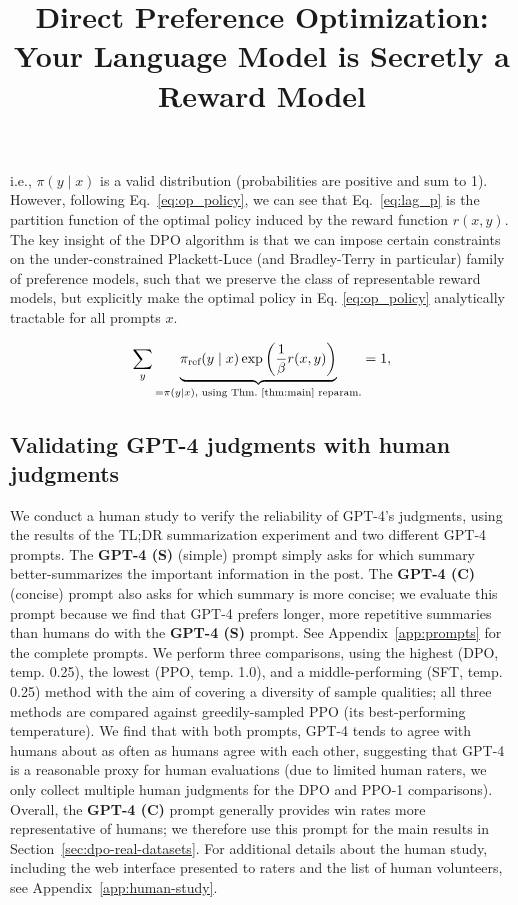 \title{Direct Preference Optimization: Your Language Model is Secretly a Reward Model}
i.e., $\pi(y\mid x)$ is a valid distribution (probabilities are positive and sum to 1). However, following Eq.~\ref{eq:op_policy}, we can see that Eq.~\ref{eq:lag_p} is the partition function of the optimal policy induced by the reward function $r(x, y)$. The key insight of the DPO algorithm is that we can impose certain constraints on the under-constrained Plackett-Luce (and Bradley-Terry in particular) family of preference models, such that we preserve the class of representable reward models, but explicitly make the optimal policy in Eq. \ref{eq:op_policy} analytically tractable for all prompts $x$.

\begin{equation}\label{eq:lag_p}
     \sum_{y}\underbrace{\pi_\text{ref}(y\mid x)\exp\left(\frac{1}{\beta}r(x, y)\right)}_{=\pi(y\mid x)\text{, using Thm.~\ref{thm:main} reparam.}} = 1,
\end{equation}

\subsection{Validating GPT-4 judgments with human judgments}
\label{sec:human-judgments}
We conduct a human study to verify the reliability of GPT-4's judgments, using the results of the TL;DR summarization experiment and two different GPT-4 prompts. The \textbf{GPT-4 (S)} (simple) prompt simply asks for which summary better-summarizes the important information in the post. The \textbf{GPT-4 (C)} (concise) prompt also asks for which summary is more concise; we evaluate this prompt because we find that GPT-4 prefers longer, more repetitive summaries than humans do with the \textbf{GPT-4 (S)} prompt. See Appendix~\ref{app:prompts} for the complete prompts. We perform three comparisons, using the highest (DPO, temp. 0.25), the lowest (PPO, temp. 1.0), and a middle-performing (SFT, temp. 0.25) method with the aim of covering a diversity of sample qualities; all three methods are compared against greedily-sampled PPO (its best-performing temperature). We find that with both prompts, GPT-4 tends to agree with humans about as often as humans agree with each other, suggesting that GPT-4 is a reasonable proxy for human evaluations (due to limited human raters, we only collect multiple human judgments for the DPO and PPO-1 comparisons). Overall, the \textbf{GPT-4 (C)} prompt generally provides win rates more representative of humans; we therefore use this prompt for the main results in Section~\ref{sec:dpo-real-datasets}. For additional details about the human study, including the web interface presented to raters and the list of human volunteers, see Appendix~\ref{app:human-study}.

